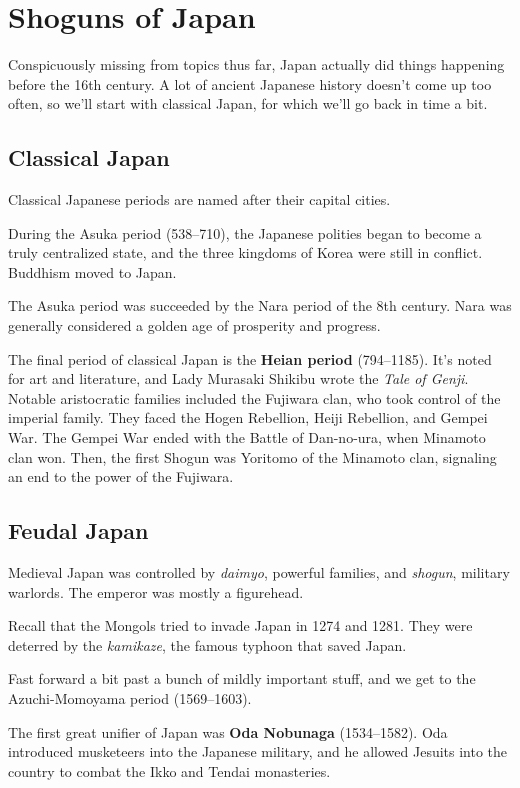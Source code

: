 \section{Shoguns of Japan}

Conspicuously missing from topics thus far,
Japan actually did things happening before the 16th century.
A lot of ancient Japanese history doesn't come up too often,
so we'll start with classical Japan, for which we'll go back in time a bit.

\subsection*{Classical Japan}

Classical Japanese periods are named after their capital cities.

During the Asuka period (538--710), the Japanese polities began to become a truly centralized state,
and the three kingdoms of Korea were still in conflict.
Buddhism moved to Japan.

The Asuka period was succeeded by the Nara period of the 8th century.
Nara was generally considered a golden age of prosperity and progress.

The final period of classical Japan is the \textbf{Heian period} (794--1185).
It's noted for art and literature, and Lady Murasaki Shikibu wrote the \textit{Tale of Genji}.
Notable aristocratic families included the Fujiwara clan, who took control of the imperial family.
They faced the Hogen Rebellion, Heiji Rebellion, and Gempei War.
The Gempei War ended with the Battle of Dan-no-ura, when Minamoto clan won.
Then, the first Shogun was Yoritomo of the Minamoto clan,
signaling an end to the power of the Fujiwara.

\subsection*{Feudal Japan}

Medieval Japan was controlled by \textit{daimyo},
powerful families, and \textit{shogun}, military warlords.
The emperor was mostly a figurehead.

Recall that the Mongols tried to invade Japan in 1274 and 1281.
They were deterred by the \textit{kamikaze}, the famous typhoon that saved Japan.

Fast forward a bit past a bunch of mildly important stuff,
and we get to the Azuchi-Momoyama period (1569--1603).

The first great unifier of Japan was \textbf{Oda Nobunaga} (1534--1582).
Oda introduced musketeers into the Japanese military,
and he allowed Jesuits into the country to combat the Ikko and Tendai monasteries.

